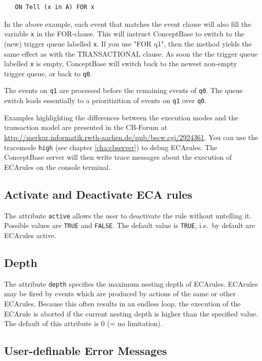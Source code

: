 {\small
\begin{verbatim}
   ON Tell (x in A) FOR x
\end{verbatim}
}
In the above example, each event that matches the event clause will also
fill the variable {\tt x} in the FOR-clause. This will instruct ConceptBase to
switch to the (new) trigger queue labelled {\tt x}. If you use
"FOR q1", then the method yields the same effect as with the TRANSACTIONAL
clause. As soon the the trigger queue labelled {\tt x} is empty, ConceptBase
will switch back to the newest non-empty trigger queue, or back to {\tt q0}.

The events on {\tt q1} are processed before the remaining events of
{\tt q0}. The queue switch leads essentially to a prioritizition
of events on {\tt q1} over {\tt q0}.


Examples highlighting the differences between the execution modes and the
transaction model are presented in
the CB-Forum at \url{http://merkur.informatik.rwth-aachen.de/pub/bscw.cgi/2924361}.
You can use the tracemode {\tt high} (see chapter \ref{cha:cbserver}) to debug ECArules. 
The ConceptBase server will then write trace messages about the execution of ECArules on
the console terminal. 


\subsection{Activate and Deactivate ECA rules}

The attribute {\tt active} allows the user to deactivate
the rule without untelling it. Possible values are {\tt TRUE}
and {\tt FALSE}. The default value is {\tt TRUE}, i.e.\ by default
are ECArules active.

\subsection{Depth}

The attribute {\tt depth} specifies the maximum nesting depth
of ECArules. ECArules may be fired by events which are produced
by actions of the same or other ECArules. Because this often results
in an endless loop, the execution of the ECArule is aborted
if the current nesting depth is higher than the specified value.
The default of this attribute is 0 (= no limitation).

\subsection{User-definable Error Messages}

